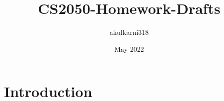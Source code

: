 \documentclass{article}
\title{CS2050-Homework-Drafts}
\author{akulkarni318 }
\date{May 2022}
\begin{document}
\maketitle

\section{Introduction}
\end{document}
